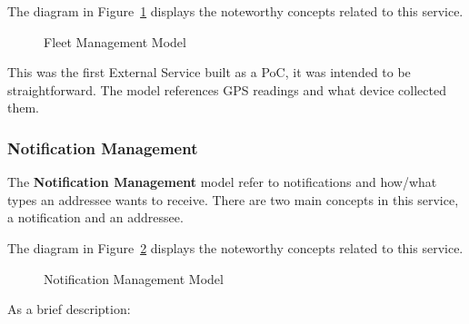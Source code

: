 The diagram in Figure~\ref{fig:design:domain:bounded_contexts:fleet:diagram} displays the noteworthy concepts related to this service.

\begin{figure}[H]
   \centering
  \resizebox{\columnwidth}{!}
  {
     
  }
  \caption[Fleet Management Model]{Fleet Management Model}
  \label{fig:design:domain:bounded_contexts:fleet:diagram}
\end{figure}

This was the first External Service built as a \gls{PoC}, it was intended to be straightforward. The model references \gls{GPS} readings and what device collected them.

\subsubsection{Notification Management}
\label{subsubsec:design:domain:bounded_contexts:notification}

The \textbf{Notification Management} model refer to notifications and how/what types an addressee wants to receive. There are two main concepts in this service, a notification and an addressee.

The diagram in Figure~\ref{fig:design:domain:bounded_contexts:notification:diagram} displays the noteworthy concepts related to this service.

\begin{figure}[H]
   \centering
  \resizebox{\columnwidth}{!}
  {
     
  }
  \caption[Notification Management Model]{Notification Management Model}
  \label{fig:design:domain:bounded_contexts:notification:diagram}
\end{figure}

As a brief description:

